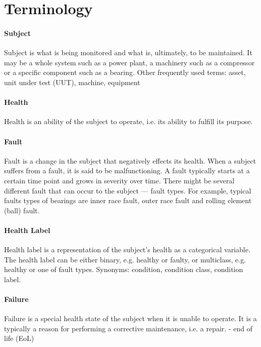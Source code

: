 
\section{Terminology}
\label{sec:pdm_terminology}

\paragraph{Subject}

Subject is what is being monitored and what is, ultimately, to be maintained.
It may be a whole system such as a power plant, a machinery such as a compressor or a specific component such as a bearing.
Other frequently used terms: asset, unit under test (UUT), machine, equipment

\paragraph{Health}
Health is an ability of the subject to operate, i.e. its ability to fulfill its purpose.

\paragraph{Fault}
Fault is a change in the subject that negatively effects its health.
When a subject suffers from a fault, it is said to be malfunctioning.
A fault typically starts at a certain time point and grows in severity over time.
There might be several different fault that can occur to the subject --- fault types.
For example, typical faults types of bearings are inner race fault, outer race fault and rolling  element (ball) fault.

\paragraph{Health Label}

Health label is a representation of the subject's health as a categorical variable.
The health label can be either binary, e.g. healthy or faulty, or multiclass, e.g. healthy or one of fault types.
Synonyms: condition, condition class, condition label.

\paragraph{Failure}
Failure is a special health state of the subject when it is unable to operate.
It is a typically a reason for performing a corrective maintenance, i.e. a repair.
 - end of life (EoL)


